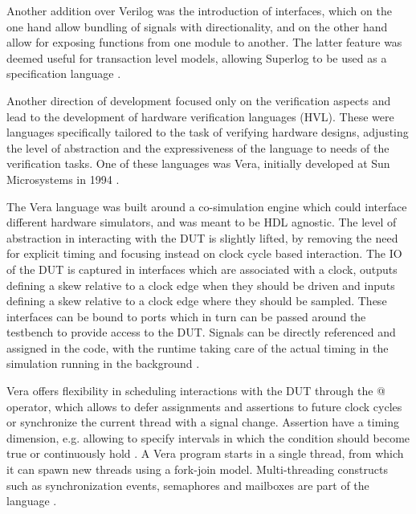 \documentclass[11pt]{report}
\begin{document}
Another addition over Verilog was the introduction of interfaces, which on the one hand allow bundling of signals
with directionality, and on the other hand allow for exposing functions from one module to another. The latter
feature was deemed useful for transaction level models, allowing Superlog to be used as a specification language
\cite[Sec. 6]{flake2020a}.

Another direction of development focused only on the verification aspects and lead to the development of hardware
verification languages (HVL). These were languages specifically tailored to the task of verifying hardware designs,
adjusting the level of abstraction and the expressiveness of the language to needs of the verification tasks. One of
these languages was Vera, initially developed at Sun Microsystems in 1994 \cite[Sec. 7]{flake2020a}.

The Vera language was built around a co-simulation engine which could interface different hardware simulators, and
was meant to be HDL agnostic. The level of abstraction in interacting with the DUT is slightly lifted, by removing
the need for explicit timing and focusing instead on clock cycle based interaction. The IO of the DUT is captured in
interfaces which are associated with a clock, outputs defining a skew relative to a clock edge when they should be
driven and inputs defining a skew relative to a clock edge where they should be sampled. These interfaces can be
bound to ports which in turn can be passed around the testbench to provide access to the DUT. Signals can be directly
referenced and assigned in the code, with the runtime taking care of the actual timing in the simulation running in
the background \cite[Sec. 7]{flake2020a}.

Vera offers flexibility in scheduling interactions with the DUT through the @ operator, which allows to defer
assignments and assertions to future clock cycles or synchronize the current thread with a signal change. Assertion
have a timing dimension, e.g. allowing to specify intervals in which the condition should become true or continuously
hold . A Vera program starts in a single thread, from which it can spawn new threads using a fork-join model.
Multi-threading constructs such as synchronization events, semaphores and mailboxes are part of the language
\cite[Sec. 7]{flake2020a}.
\end{document}
